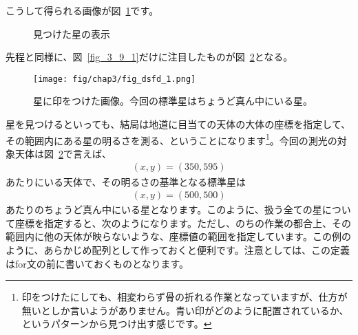 こうして得られる画像が図~\ref{fig_3_9}です。
\begin{figure}
	\centering
	\caption[見つけた星の表示]{見つけた星の表示}
	\label{fig_3_9}
\end{figure}
先程と同様に、図~\ref{fig_3_9_1}だけに注目したものが図~\ref{fig_3_10}となる。
\begin{figure}
	\centering
	\texttt{[image: fig/chap3/fig\_dsfd\_1.png]}
	\caption[星に印をつけた画像]{星に印をつけた画像。今回の標準星はちょうど真ん中にいる星。\label{fig_3_10}}
\end{figure}

星を見つけるといっても、結局は地道に目当ての天体の大体の座標を指定して、その範囲内にある星の明るさを測る、ということになります\footnote{印をつけたにしても、相変わらず骨の折れる作業となっていますが、仕方が無いとしか言いようがありません。青い印がどのように配置されているか、というパターンから見つけ出す感じです。}。今回の測光の対象天体は図~\ref{fig_3_10}で言えば、
\begin{align*}
	(x,y) = (350,595)
\end{align*}
あたりにいる天体で、その明るさの基準となる標準星は
\begin{align*}
	(x,y) = (500,500)
\end{align*}
あたりのちょうど真ん中にいる星となります。このように、扱う全ての星について座標を指定すると、次のようになります。ただし、のちの作業の都合上、その範囲内に他の天体が映らないような、座標値の範囲を指定しています。この例のように、あらかじめ配列として作っておくと便利です。注意としては、この定義はfor文の前に書いておくものとなります。

